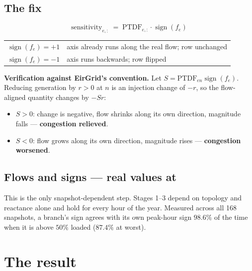 \documentclass[11pt,a4paper]{article}
\newcommand{\note}[1]{{\color{soft}\small #1}}
\begin{document}
\subsection*{The fix}

\begin{equation}
  \boxed{\;\text{sensitivity}_{e,:} \;=\; \text{PTDF}_{e,:}\cdot
  \operatorname{sign}(f_e)\;}
\end{equation}

\begin{center}\small
\begin{tabular}{ll}
\toprule
$\operatorname{sign}(f_e) = +1$ & axis already runs along the real flow; row unchanged\\
$\operatorname{sign}(f_e) = -1$ & axis runs backwards; row flipped\\
\bottomrule
\end{tabular}
\end{center}

\textbf{Verification against EirGrid's convention.} Let
$S = \text{PTDF}_{en}\operatorname{sign}(f_e)$. Reducing generation by $r>0$ at
$n$ is an injection change of $-r$, so the flow-aligned quantity changes by
$-Sr$:
\begin{itemize}\itemsep0pt
  \item $S>0$: change is negative, flow shrinks along its own direction,
        magnitude falls --- \textbf{congestion relieved}. \checkmark{}
  \item $S<0$: flow grows along its own direction, magnitude rises ---
        \textbf{congestion worsened}. \checkmark{}
\end{itemize}

\subsection*{Flows and signs --- real values at \texttt{\gsnap}}

\begin{center}\end{center}

\note{This is the only snapshot-dependent step. Stages 1--3 depend on topology
and reactance alone and hold for every hour of the year. Measured across all
168 snapshots, a branch's sign agrees with its own peak-hour sign $98.6\%$ of
the time when it is above $50\%$ loaded ($87.4\%$ at worst).}

\newpage
\section{The result}
\end{document}
